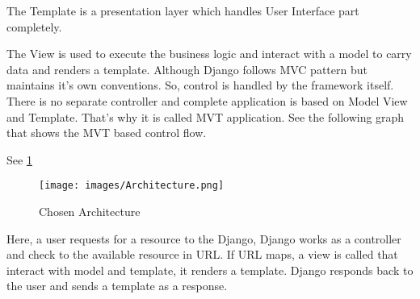 \documentclass[12pt]{article}
\begin{document}
The Template is a presentation layer which handles User Interface part completely.

The View is used to execute the business logic and interact with a model to carry data and renders a template. Although Django follows MVC pattern but maintains it’s own conventions. So, control is handled by the framework itself. There is no separate controller and complete application is based on Model View and Template. That’s why it is called MVT application. See the following graph that shows the MVT based control flow.

See \ref{fig:Chosen Architecture}
\begin{figure}[h]
    \centering
    \texttt{[image: images/Architecture.png]}
    \caption{Chosen Architecture}
    \label{fig:Chosen Architecture}
\end{figure}

Here, a user requests for a resource to the Django, Django works as a controller and check to the available resource in URL. If URL maps, a view is called that interact with model and template, it renders a template. Django responds back to the user and sends a template as a response.
\end{document}

